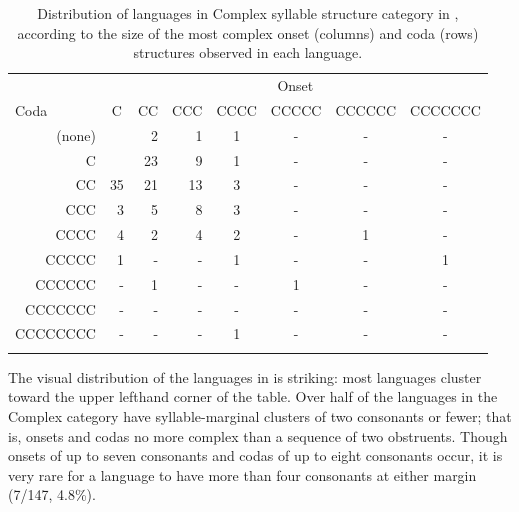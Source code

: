 \begin{table}
\begin{tabular}{*{4}{r}*{4}{c}}
\lsptoprule
                 & \multicolumn{7}{c}{Onset}\\\cmidrule(lr){2-8}
 \multicolumn{1}{l}{Coda}     & \multicolumn{1}{c}{C} & \multicolumn{1}{c}{CC} & \multicolumn{1}{c}{CCC} & \multicolumn{1}{c}{CCCC} & \multicolumn{1}{c}{CCCCC} & \multicolumn{1}{c}{CCCCCC} & \multicolumn{1}{c}{CCCCCCC}\\\midrule
 {(none)}   & \cellcolor{lsLightGray} & 2 & 1 & 1 & - & - & -\\
 {C}        & \cellcolor{lsLightGray} & 23 & 9 & 1 & - & - & -\\
 {CC}       & 35 & 21 & 13 & 3 & - & - & -\\
 {CCC}      & 3 & 5 & 8 & 3 & - & - & -\\
 {CCCC}     & 4 & 2 & 4 & 2 & - & 1 & -\\
 {CCCCC}    & 1 & - & - & 1 & - & - & 1\\
 {CCCCCC}   & - & 1 & - & - & 1 & - & -\\
 {CCCCCCC}  & - & - & - & - & - & - & -\\
 {CCCCCCCC} & - & - & - & 1 & - & - & -\\
\lspbottomrule
\end{tabular}
\caption{\label{tab:2.2}Distribution of languages in Complex syllable structure category in \citet{Maddieson2013a}, according to the size of the most complex onset (columns) and coda (rows) structures observed in each language.}
\end{table}

  The visual distribution of the languages in  is striking: most languages cluster toward the upper lefthand corner of the table. Over half of the languages in the Complex category have syllable-marginal clusters of two consonants or fewer; that is, onsets and codas no more complex than a sequence of two obstruents. Though onsets of up to seven consonants and codas of up to eight consonants occur, it is very rare for a language to have more than four consonants at either margin (7/147, 4.8\%).

